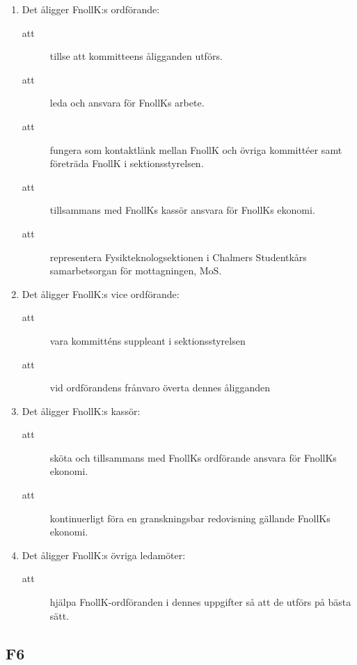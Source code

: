 \documentclass[11pt,a4paper]{article}
\begin{document}
\begin{enumerate}[\thesubsection .1]
  \item Det åligger FnollK:s ordförande:
    \begin{description}
      \item[att] tillse att kommitteens åligganden utförs.
      \item[att] leda och ansvara för FnollKs arbete.
     
     
      \item[att] fungera som kontaktlänk mellan FnollK och övriga kommittéer samt företräda FnollK i sektionsstyrelsen.
      \item[att] tillsammans med FnollKs kassör ansvara för FnollKs ekonomi.
      \item[att] representera Fysikteknologsektionen i Chalmers Studentkårs samarbetsorgan för mottagningen, MoS.
    \end{description}

\item Det åligger FnollK:s vice ordförande:
\begin{description}
 \item[att] vara kommitténs suppleant i sektionsstyrelsen
 \item[att] vid ordförandens frånvaro överta dennes åligganden
\end{description}

  \item Det åligger FnollK:s kassör:
    \begin{description}
      \item[att] sköta och tillsammans med FnollKs ordförande an\-sva\-ra för FnollKs ekonomi.
      \item[att] kontinuerligt föra en granskningsbar redovisning gällande FnollKs  ekonomi.
    \end{description}


  \item Det åligger FnollK:s övriga ledamöter:
    \begin{description}
      \item[att] hjälpa FnollK-ordföranden i dennes uppgifter så att de utförs på bästa sätt.
    \end{description}

\end{enumerate}

\subsection{F6}
\end{document}
